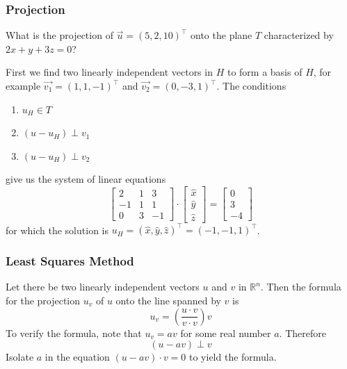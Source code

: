 \documentclass[xcolor=dvipsnames]{beamer}
\begin{document}
\begin{frame}
  \frametitle{Projection}
   What is the projection of
  $\vec{u}=(5,2,10)^{\intercal}$ onto the plane $T$ characterized by
  $2x+y+3z=0$?

  \medskip

  First we find two linearly independent vectors in $H$ to form a
  basis of $H$, for example $\vec{v_{1}}=(1,1,-1)^{\intercal}$ and
  $\vec{v_{2}}=(0,-3,1)^{\intercal}$. The conditions
  \begin{enumerate}
  \item $u_{H}\in{}T$
  \item $(u-u_{H})\perp{}v_{1}$
  \item $(u-u_{H})\perp{}v_{2}$
  \end{enumerate}
  give us the system of linear equations
  \begin{equation}
    \label{eq:faishiso}
    \left[
      \begin{array}{ccc}
        2 & 1 & 3 \\
        -1 & 1 & 1 \\
        0 & 3 & -1
      \end{array}\right]\cdot\left[
      \begin{array}{c}
        \hat{x} \\
        \hat{y} \\
        \hat{z}
      \end{array}\right]=\left[
      \begin{array}{c}
        0 \\
        3 \\
        -4
      \end{array}\right]
  \end{equation}
for which the solution is $u_{H}=(\hat{x},\hat{y},\hat{z})^{\intercal}=(-1,-1,1)^{\intercal}$.
\end{frame}

\begin{frame}
  \frametitle{Least Squares Method}
  Let there be two linearly independent vectors $u$ and $v$ in
  $\mathbb{R}^{n}$. Then the formula for the projection $u_{v}$ of $u$ onto
  the line spanned by $v$ is
  \begin{equation}
    \label{eq:weehohqu}
    u_{v}=\left(\frac{u\cdot{}v}{v\cdot{}v}\right)v
  \end{equation}
To verify the formula, note that $u_{v}=av$ for some real number $a$.
Therefore
\begin{equation}
  \label{eq:yahveego}
  (u-av)\perp{}v
\end{equation}
Isolate $a$ in the equation $(u-av)\cdot{}v=0$ to yield the formula.
\end{frame}
\end{document}
